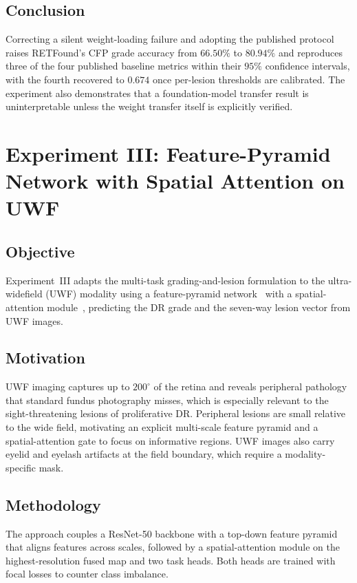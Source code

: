 \documentclass[journal,twoside,web]{ieeecolor}
\begin{document}
\subsection{Conclusion}
Correcting a silent weight-loading failure and adopting the published protocol raises
RETFound's CFP grade accuracy from $66.50\%$ to $80.94\%$ and reproduces three of the four
published baseline metrics within their $95\%$ confidence intervals, with the fourth
recovered to $0.674$ once per-lesion thresholds are calibrated. The experiment also
demonstrates that a foundation-model transfer result is uninterpretable unless the weight
transfer itself is explicitly verified.

\section{Experiment III: Feature-Pyramid Network with Spatial Attention on UWF}
\label{sec:exp3}

\subsection{Objective}
Experiment~III adapts the multi-task grading-and-lesion formulation to the
ultra-widefield (UWF) modality using a feature-pyramid network~\cite{fpn} with a
spatial-attention module~\cite{cbam}, predicting the DR grade and the seven-way
lesion vector from UWF images.

\subsection{Motivation}
UWF imaging captures up to $200^{\circ}$ of the retina and reveals peripheral
pathology that standard fundus photography misses, which is especially relevant
to the sight-threatening lesions of proliferative DR. Peripheral lesions are
small relative to the wide field, motivating an explicit multi-scale feature
pyramid and a spatial-attention gate to focus on informative regions. UWF images
also carry eyelid and eyelash artifacts at the field boundary, which require a
modality-specific mask.

\subsection{Methodology}
The approach couples a ResNet-50 backbone with a top-down feature pyramid that
aligns features across scales, followed by a spatial-attention module on the
highest-resolution fused map and two task heads. Both heads are trained with
focal losses to counter class imbalance.
\end{document}
